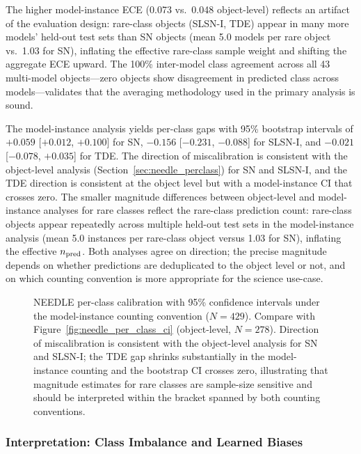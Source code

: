 \documentclass[twocolumn]{aastex631}
\begin{document}
The higher model-instance ECE (0.073 vs.\ 0.048 object-level) reflects an artifact of the evaluation design: rare-class objects (SLSN-I, TDE) appear in many more models' held-out test sets than SN objects (mean 5.0 models per rare object vs.\ 1.03 for SN), inflating the effective rare-class sample weight and shifting the aggregate ECE upward. The 100\% inter-model class agreement across all 43 multi-model objects---zero objects show disagreement in predicted class across models---validates that the averaging methodology used in the primary analysis is sound.

The model-instance analysis yields per-class gaps with 95\% bootstrap
intervals of $+0.059$ [$+0.012$, $+0.100$] for SN, $-0.156$ [$-0.231$,
$-0.088$] for SLSN-I, and $-0.021$ [$-0.078$, $+0.035$] for TDE. The
direction of miscalibration is consistent with the object-level analysis
(Section~\ref{sec:needle_perclass}) for SN and SLSN-I, and the TDE
direction is consistent at the object level but with a model-instance CI
that crosses zero. The smaller magnitude differences between object-level
and model-instance analyses for rare classes reflect the rare-class
prediction count: rare-class objects appear repeatedly across multiple
held-out test sets in the model-instance analysis (mean 5.0 instances
per rare-class object versus 1.03 for SN), inflating the effective
$n_{\rm pred}$. Both analyses agree on direction; the precise magnitude
depends on whether predictions are deduplicated to the object level or
not, and on which counting convention is more appropriate for the
science use-case.

\begin{figure}[t]
\caption{NEEDLE per-class calibration with 95\% confidence intervals
under the model-instance counting convention ($N = 429$). Compare with
Figure~\ref{fig:needle_per_class_ci} (object-level, $N = 278$).
Direction of miscalibration is consistent with the object-level
analysis for SN and SLSN-I; the TDE gap shrinks substantially in the
model-instance counting and the bootstrap CI crosses zero, illustrating
that magnitude estimates for rare classes are sample-size sensitive
and should be interpreted within the bracket spanned by both
counting conventions. \label{fig:needle_per_class_ci_mi}}
\end{figure}

\subsubsection{Interpretation: Class Imbalance and Learned Biases} \label{sec:needle_interp}
\end{document}
